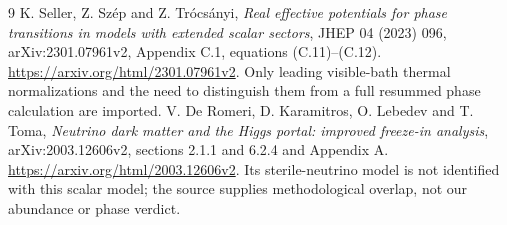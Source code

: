 \documentclass[11pt]{article}
\begin{document}
\begin{thebibliography}{9}
 K. Seller, Z. Sz\'ep and Z. Tr\'ocs\'anyi,
\emph{Real effective potentials for phase transitions in models with extended
scalar sectors}, JHEP 04 (2023) 096, arXiv:2301.07961v2,
Appendix C.1, equations (C.11)--(C.12).
\url{https://arxiv.org/html/2301.07961v2}.
Only leading visible-bath thermal normalizations and the need to distinguish
them from a full resummed phase calculation are imported.
 V. De Romeri, D. Karamitros, O. Lebedev and T. Toma,
\emph{Neutrino dark matter and the Higgs portal: improved freeze-in analysis},
arXiv:2003.12606v2, sections 2.1.1 and 6.2.4 and Appendix A.
\url{https://arxiv.org/html/2003.12606v2}.
Its sterile-neutrino model is not identified with this scalar model;
the source supplies methodological overlap, not our abundance or phase verdict.
\end{thebibliography}
\end{document}
